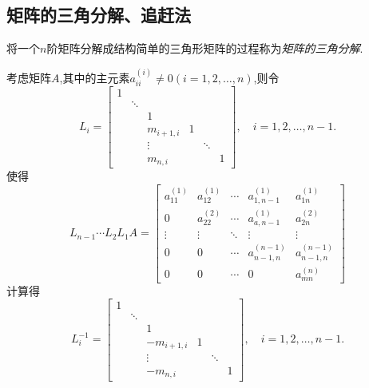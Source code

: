 \subsection{矩阵的三角分解、追赶法}
将一个$n$阶矩阵分解成结构简单的三角形矩阵的过程称为\emph{矩阵的三角分解}.\par
考虑矩阵$A$,其中的主元素$a_{ii}^{(i)}\not=0(i=1,2,\ldots,n)$,则令
\begin{equation}
L_i=\begin{bmatrix}
   1 &  \\
     & \ddots & \\
     &        &  1  & \\
     &	      & m_{i+1,i} & 1 & \\
     &        & \vdots    &   &  \ddots & \\
     &	      & m_{n,i}   &   &         &  1 
  \end{bmatrix}
  ,\quad i=1,2,\ldots,n-1.
\end{equation}
使得
\begin{equation}\label{eq:01_zgf_mt}
 L_{n-1}\cdots L_2 L_1 A=\begin{bmatrix}
                         a_11^{(1)}  &  a_12^{(1)}  &  \cdots & a_{1,n-1}^{(1)}    & a_{1n}^{(1)} \\
                         0           &  a_22^{(2)}  &  \cdots & a_{a,n-1}^{(1)}    & a_{2n}^{(2)} \\
                         \vdots      &  \vdots      &  \ddots &  \vdots            &   \vdots     \\
                         0           &    0         &  \cdots &  a_{n-1,n}^{(n-1)} & a_{n-1,n}^{(n-1)} \\
                         0           &    0         &  \cdots &     0              &    a_{mn}^{(n)}                    
                         \end{bmatrix}
\end{equation}
计算得
\begin{equation}
L_i^{-1}=\begin{bmatrix}
   1 &  \\
     & \ddots & \\
     &        &  1  & \\
     &	      & -m_{i+1,i} & 1 & \\
     &        & \vdots    &   &  \ddots & \\
     &	      & -m_{n,i}   &   &         &  1 
  \end{bmatrix}
  ,\quad i=1,2,\ldots,n-1.
\end{equation}
